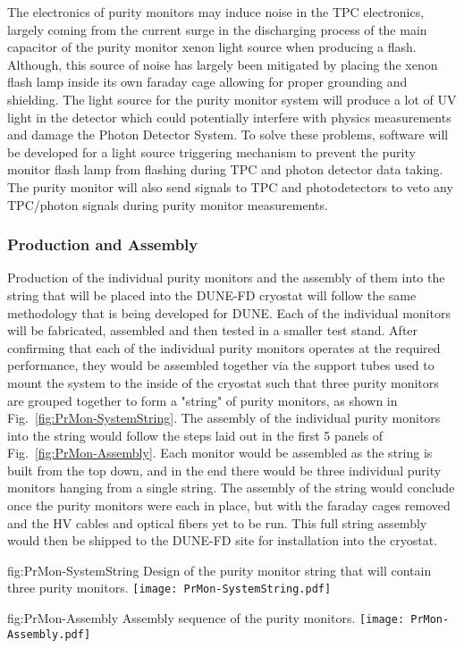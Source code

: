 The electronics of purity monitors may induce noise in the TPC electronics, largely coming from the current surge in the discharging process of the main capacitor of the purity monitor xenon light source when producing a flash.  Although, this source of noise has largely been mitigated by placing the xenon flash lamp inside its own faraday cage allowing for proper grounding and shielding.  The light source for the purity monitor system will produce a lot of UV light in the detector which could potentially interfere with physics measurements and damage the Photon Detector System. To solve these problems, software will be developed for a light source triggering mechanism to prevent the purity monitor flash lamp from flashing during TPC and photon detector data taking. The purity monitor will also send signals to TPC and photodetectors to veto any TPC/photon signals during purity monitor measurements. 


\subsubsection{Production and Assembly}
\label{sec:PrMon-Production-Assembly}
Production of the individual purity monitors and the assembly of them into the string that will be placed into the DUNE-FD cryostat will follow the same methodology that is being developed for DUNE.  Each of the individual monitors will be fabricated, assembled and then tested in a smaller test stand.  After confirming that each of the individual purity monitors operates at the required performance, they would be assembled together via the support tubes used to mount the system to the inside of the cryostat such that three purity monitors are grouped together to form a "string" of purity monitors, as shown in Fig.~\ref{fig:PrMon-SystemString}.  The assembly of the individual purity monitors into the string would follow the steps laid out in the first 5 panels of Fig.~\ref{fig:PrMon-Assembly}.  Each monitor would be assembled as the string is built from the top down, and in the end there would be three individual purity monitors hanging from a single string.  The assembly of the string would conclude once the purity monitors were each in place, but with the faraday cages removed and the HV cables and optical fibers yet to be run.  This full string assembly would then be shipped to the DUNE-FD site for installation into the cryostat.

\begin{dunefigure}{fig:PrMon-SystemString}
  {Design of the purity monitor string that will contain three purity monitors.}
  \texttt{[image: PrMon-SystemString.pdf]}
\end{dunefigure}

\begin{dunefigure}{fig:PrMon-Assembly}
  {Assembly sequence of the purity monitors.}
  \texttt{[image: PrMon-Assembly.pdf]}
\end{dunefigure}



